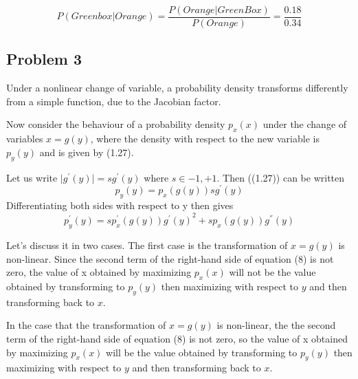 \documentclass{article}
\begin{document}
\begin{flushleft}
\begin{equation}
P(Green box|Orange) = \frac{P(Orange|Green Box)}{P(Orange)} = \frac{0.18}{0.34}
\end{equation}

\subsection*{Problem 3}
Under a nonlinear change of variable, a probability density transforms differently from a simple function, due to the Jacobian factor.

Now consider the behaviour of a probability density $p_x(x)$ under the change of variables $x = g(y)$, where the density with respect to the new variable is $p_y(y)$ and is given by (1.27).

Let us write $\lvert{g^{'}(y)}\rvert = sg^{'}(y)$ where 
$s\in{−1, +1}$. Then ((1.27)) can be written
\begin{equation}
p_y(y) = p_x(g(y))sg^{'}(y)
\end{equation}
Differentiating both sides with respect to y then gives
\begin{equation}
p_y^{'}(y) = sp_x^{'}(g(y)){g^{'}(y)}^2 + sp_x(g(y))g^{''}(y)
\end{equation}






Let's discuss it in two cases.
The first case is the transformation of $x=g(y)$ is non-linear.
Since the second term of the right-hand side of equation (8) is not zero, the value of x obtained by maximizing $p_x(x)$ will not be the value obtained by transforming to $p_y(y)$ then maximizing with respect to $y$ and then transforming back to $x$. 

In the case that the transformation of $x=g(y)$ is non-linear, the  the second term of the right-hand side of equation (8) is not zero, so the value of x obtained by maximizing $p_x(x)$ will be the value obtained by transforming to $p_y(y)$ then maximizing with respect to $y$ and then transforming back to $x$.
\end{flushleft}
\end{document}
